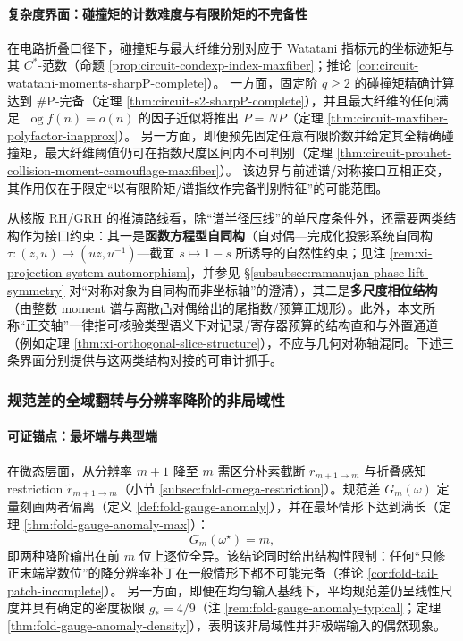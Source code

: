 \paragraph{复杂度界面：碰撞矩的计数难度与有限阶矩的不完备性}
在电路折叠口径下，碰撞矩与最大纤维分别对应于 Watatani 指标元的坐标迹矩与其 \(C^\ast\)-范数（命题 \ref{prop:circuit-condexp-index-maxfiber}；推论 \ref{cor:circuit-watatani-moments-sharpP-complete}）。
一方面，固定阶 \(q\ge 2\) 的碰撞矩精确计算达到 \(\#\mathrm{P}\)-完备（定理 \ref{thm:circuit-s2-sharpP-complete}），并且最大纤维的任何满足 \(\log f(n)=o(n)\) 的因子近似将推出 \(P=NP\)（定理 \ref{thm:circuit-maxfiber-polyfactor-inapprox}）。
另一方面，即便预先固定任意有限阶数并给定其全精确碰撞矩，最大纤维阈值仍可在指数尺度区间内不可判别（定理 \ref{thm:circuit-prouhet-collision-moment-camouflage-maxfiber}）。
该边界与前述谱/对称接口互相正交，其作用仅在于限定“以有限阶矩/谱指纹作完备判别特征”的可能范围。
\par
从核版 RH/GRH 的推演路线看，除“谱半径压线”的单尺度条件外，还需要两类结构作为接口约束：其一是\textbf{函数方程型自同构}（自对偶—完成化投影系统自同构 \(\tau:(z,u)\mapsto(uz,u^{-1})\)—截面 \(s\mapsto 1-s\) 所诱导的自然性约束；见注 \ref{rem:xi-projection-system-automorphism}，并参见 \S\ref{subsubsec:ramanujan-phase-lift-symmetry} 对“对称对象为自同构而非坐标轴”的澄清），其二是\textbf{多尺度相位结构}（由整数 moment 谱与离散凸对偶给出的尾指数/预算正规形）。此外，本文所称“正交轴”一律指可核验类型语义下对记录/寄存器预算的结构直和与外置通道（例如定理 \ref{thm:xi-orthogonal-slice-structure}），不应与几何对称轴混同。下述三条界面分别提供与这两类结构对接的可审计抓手。

\subsubsection{规范差的全域翻转与分辨率降阶的非局域性}\label{subsubsec:insight-gauge-anomaly}
\paragraph{可证锚点：最坏端与典型端}
在微态层面，从分辨率 \(m+1\) 降至 \(m\) 需区分朴素截断 \(r_{m+1\to m}\) 与折叠感知 restriction \(\widetilde r_{m+1\to m}\)（小节 \ref{subsec:fold-omega-restriction}）。规范差 \(G_m(\omega)\) 定量刻画两者偏离（定义 \ref{def:fold-gauge-anomaly}），并在最坏情形下达到满长（定理 \ref{thm:fold-gauge-anomaly-max}）：
\[
G_m(\omega^\star)=m,
\]
即两种降阶输出在前 \(m\) 位上逐位全异。该结论同时给出结构性限制：任何“只修正末端常数位”的降分辨率补丁在一般情形下都不可能完备（推论 \ref{cor:fold-tail-patch-incomplete}）。
另一方面，即便在均匀输入基线下，平均规范差仍呈线性尺度并具有确定的密度极限 \(g_\ast=4/9\)（注 \ref{rem:fold-gauge-anomaly-typical}；定理 \ref{thm:fold-gauge-anomaly-density}），表明该非局域性并非极端输入的偶然现象。

